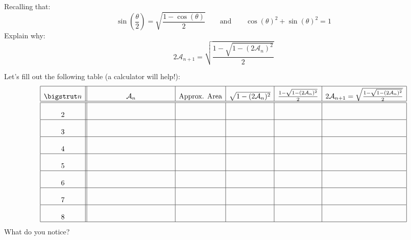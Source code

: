 \documentclass[nooutcomes]{ximera}
\begin{document}
\begin{problem}
Recalling that:
\[
\sin\left(\frac{\theta}{2}\right) = \sqrt{\frac{1-\cos(\theta)}{2}}
\qquad\text{and}\qquad
\cos(\theta)^2 + \sin(\theta)^2 = 1
\]
Explain why:
\[
2 \mathcal{A}_{n+1} = \sqrt{\frac{1 - \sqrt{1 - (2\mathcal{A}_n)^2}}{2}}
\]
\end{problem}


\begin{problem} 
Let's fill out the following table (a calculator will help!):
\[
\begin{array}{| c || c | c | c | c | c |}
\hline\bigstrut
n  & \mathcal{A}_n & \text{Approx. Area} & \sqrt{1-(2\mathcal{A}_n)^2} & \frac{1 - \sqrt{1-(2\mathcal{A}_n)^2} }{2} &\rule[0mm]{0mm}{6mm}2\mathcal{A}_{n+1} =\sqrt{\frac{1 - \sqrt{1-(2\mathcal{A}_n)^2} }{2}} \\ \hline\hline 
2 &\rule[7mm]{20mm}{0mm}\hspace{20mm}  &\hspace{20mm}  &\hspace{20mm}  & \hspace{20mm} & \hspace{20mm}\\ \hline
3 &\rule[0mm]{0mm}{7mm}   &  &  & &   \\ \hline
4 &\rule[0mm]{0mm}{7mm}   &  &  & &   \\ \hline
5 &\rule[0mm]{0mm}{7mm}   &  &  & &   \\ \hline
6 &\rule[0mm]{0mm}{7mm}   &  &  & &   \\ \hline
7 &\rule[0mm]{0mm}{7mm}   &  &  & &   \\ \hline
8 &\rule[0mm]{0mm}{7mm}   &  &  & &   \\ \hline
\end{array}
\]
What do you notice?
\end{problem}
\end{document}
